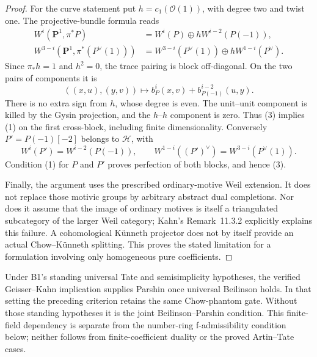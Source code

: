 \begin{proof}
For the curve statement put \(h=c_1(\mathcal O(1))\), with degree two
and twist one.  The projective-bundle formula reads
\[
\begin{aligned}
 W^i(\mathbf P^1,\pi^*P)
   &=W^i(P)\oplus h W^{i-2}(P(-1)),\\
 W^{3-i}(\mathbf P^1,\pi^*(P^\vee(1)))
   &=W^{3-i}(P^\vee(1))\oplus hW^{1-i}(P^\vee).
\end{aligned}
\]
Since \(\pi_*h=1\) and \(h^2=0\), the trace pairing is block
off-diagonal.  On the two pairs of components it is
\[
 ((x,u),(y,v))\longmapsto
 b_P^i(x,v)+b_{P(-1)}^{i-2}(u,y).
\]
There is no extra sign from \(h\), whose degree is even.  The
unit--unit component is killed by the Gysin projection, and the
\(h\)--\(h\) component is zero.  Thus (3) implies (1) on the first
cross-block, including finite dimensionality.  Conversely
\(P'=P(-1)[-2]\) belongs to \(\mathcal H\), with
\[
 W^i(P')=W^{i-2}(P(-1)),\qquad
 W^{1-i}((P')^\vee)=W^{3-i}(P^\vee(1)).
\]
Condition (1) for \(P\) and \(P'\) proves perfection of both blocks,
and hence (3).

Finally, the argument uses the prescribed ordinary-motive Weil
extension.  It does not replace those motivic groups by arbitrary
abstract dual completions.  Nor does it assume that the image of
ordinary motives is itself a triangulated subcategory of the larger
Weil category; Kahn's Remark~11.3.2 explicitly explains this failure.
A cohomological K\"unneth projector does not by itself provide an
actual Chow--K\"unneth splitting.  This proves the stated limitation
for a formulation involving only homogeneous pure coefficients.
\end{proof}

Under B1's standing universal Tate and semisimplicity hypotheses, the
verified Geisser--Kahn implication supplies Parshin once universal
Beilinson holds.  In that setting the preceding criterion retains the
same Chow-phantom gate.  Without those standing hypotheses it is the
joint Beilinson--Parshin condition.  This finite-field dependency is
separate from the number-ring f-admissibility condition below; neither
follows from finite-coefficient duality or the proved Artin--Tate cases.
